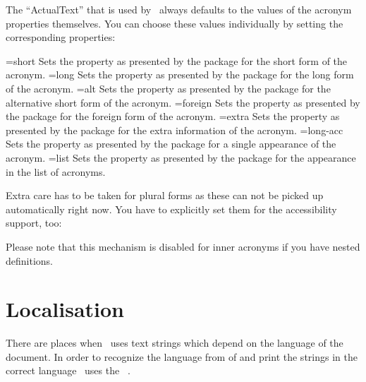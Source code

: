 \documentclass{acro-manual}
\begin{document}
The \enquote{ActualText} that is used by \acro\ always defaults to the values
of the acronym properties themselves.  You can choose these values
individually by setting the corresponding properties:
\begin{properties}
  \Initial={short}
    Sets the  property as presented by the 
    package for the short form of the acronym.
  \Initial={long}
    Sets the  property as presented by the 
    package for the long form of the acronym.
  \Initial={alt}
    Sets the  property as presented by the 
    package for the alternative short form of the acronym.
  \Initial={foreign}
    Sets the  property as presented by the 
    package for the foreign form of the acronym.
  \Initial={extra}
    Sets the  property as presented by the 
    package for the extra information of the acronym.
  \Initial={long-acc}
    Sets the  property as presented by the 
    package for a single appearance of the acronym.
  \Initial={list}
    Sets the  property as presented by the 
    package for the appearance in the list of acronyms.
\end{properties}

Extra care has to be taken for plural forms as these can not be picked up
automatically right now.  You have to explicitly set them for the
accessibility support, too:
\begin{sourcecode}
\end{sourcecode}

\begin{bewareofthedog}
  Please note that this mechanism is disabled for inner acronyms if you have
  nested definitions.
\end{bewareofthedog}

\section{Localisation}\label{sec:localisation}
There are places when \acro\ uses text strings which depend on the language of
the document.  In order to recognize the language from  of
 and print the strings in the correct language \acro\ uses
the ~\cite{pkg:translations}.
\end{document}
